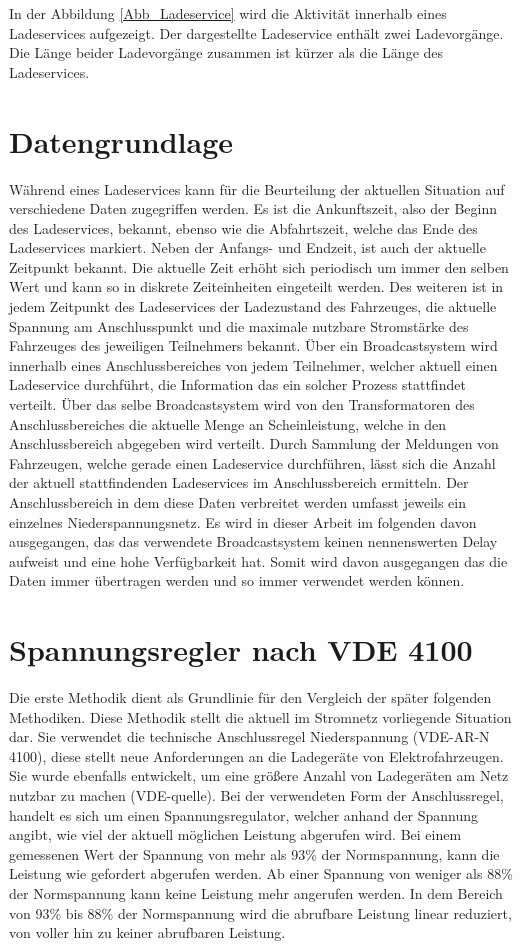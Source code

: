 In der Abbildung \ref{Abb_Ladeservice} wird die Aktivität innerhalb eines Ladeservices aufgezeigt. Der dargestellte Ladeservice enthält zwei Ladevorgänge. Die Länge beider Ladevorgänge zusammen ist kürzer als die Länge des Ladeservices.
\section{Datengrundlage}
\label{cap:background_sec:setting}
Während eines Ladeservices kann für die Beurteilung der aktuellen Situation auf verschiedene Daten zugegriffen werden. Es ist die Ankunftszeit, also der Beginn des Ladeservices, bekannt, ebenso wie die Abfahrtszeit, welche das Ende des Ladeservices markiert. Neben der Anfangs- und Endzeit, ist auch der aktuelle Zeitpunkt bekannt. Die aktuelle Zeit erhöht sich periodisch um immer den selben Wert und kann so in diskrete Zeiteinheiten eingeteilt werden. Des weiteren ist in jedem Zeitpunkt des Ladeservices der Ladezustand des Fahrzeuges, die aktuelle Spannung am Anschlusspunkt und die maximale nutzbare Stromstärke des Fahrzeuges des jeweiligen Teilnehmers bekannt. Über ein Broadcastsystem wird innerhalb eines Anschlussbereiches von jedem Teilnehmer, welcher aktuell einen Ladeservice durchführt, die Information das ein solcher Prozess stattfindet verteilt. Über das selbe Broadcastsystem wird von den Transformatoren des Anschlussbereiches die aktuelle Menge an Scheinleistung, welche in den Anschlussbereich abgegeben wird verteilt. Durch Sammlung der Meldungen von Fahrzeugen, welche gerade einen Ladeservice durchführen, lässt sich die Anzahl der aktuell stattfindenden Ladeservices im Anschlussbereich ermitteln. Der Anschlussbereich in dem diese Daten verbreitet werden umfasst jeweils ein einzelnes Niederspannungsnetz.  Es wird in dieser Arbeit im folgenden davon ausgegangen, das das verwendete Broadcastsystem keinen nennenswerten Delay aufweist und eine hohe Verfügbarkeit hat. Somit wird davon ausgegangen das die Daten immer übertragen werden und so immer verwendet werden können.

\section{Spannungsregler nach VDE 4100}
\label{capBody:VDE}
Die erste Methodik dient als Grundlinie für den Vergleich der später folgenden Methodiken. Diese Methodik stellt die aktuell im Stromnetz vorliegende Situation dar. Sie verwendet die technische Anschlussregel Niederspannung (VDE-AR-N 4100), diese stellt neue Anforderungen an die Ladegeräte von Elektrofahrzeugen. Sie wurde ebenfalls entwickelt, um eine größere Anzahl von Ladegeräten am Netz nutzbar zu machen (VDE-quelle). Bei der verwendeten Form der Anschlussregel, handelt es sich um einen Spannungsregulator, welcher anhand der Spannung angibt, wie viel der aktuell möglichen Leistung abgerufen wird. Bei einem gemessenen Wert der Spannung von mehr als 93\% der Normspannung, kann die Leistung wie gefordert abgerufen werden. Ab einer Spannung von weniger als 88\% der Normspannung kann keine Leistung mehr angerufen werden. In dem Bereich von 93\% bis 88\% der Normspannung wird die abrufbare Leistung linear reduziert, von voller hin zu keiner abrufbaren Leistung.

